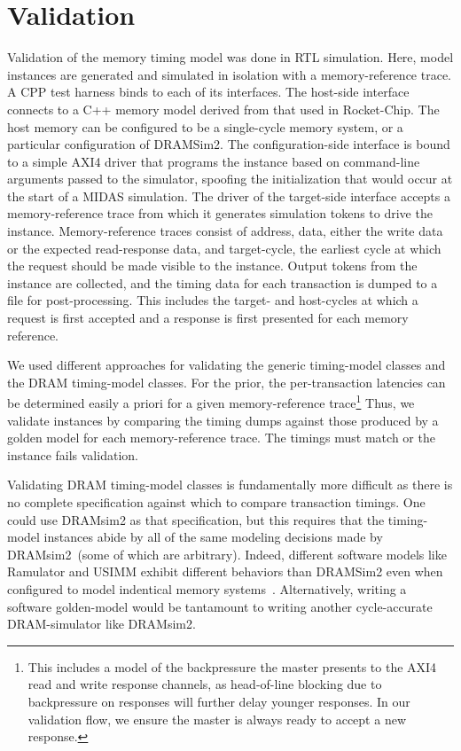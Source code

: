 \section{Validation}

Validation of the memory timing model was done in RTL simulation. Here, model
instances are generated and simulated in isolation with a memory-reference trace.
A CPP test harness binds to each of its interfaces.  The host-side interface
connects to a C++ memory model derived from that used in Rocket-Chip. The host
memory can be configured to be a single-cycle memory system, or a particular
configuration of DRAMSim2.  The configuration-side interface is bound to a
simple AXI4 driver that programs the instance based on command-line arguments
passed to the simulator, spoofing the initialization that would occur at the
start of a MIDAS simulation. The driver of the target-side interface accepts a
memory-reference trace from which it generates simulation tokens to drive the instance.
Memory-reference traces consist of address, data, either the write data or the
expected read-response data, and target-cycle, the earliest cycle at which the
request should be made visible to the instance. Output tokens from the instance are
collected, and the timing data for each transaction is dumped to a file for
post-processing. This includes the target- and host-cycles at which a request is
first accepted and a response is first presented for each memory reference.

We used different approaches for validating the generic timing-model classes
and the DRAM timing-model classes. For the prior, the per-transaction latencies
can be determined easily a priori for a given memory-reference trace\footnote{This
includes a model of the backpressure the master presents to the AXI4 read and
write response channels, as head-of-line blocking due to backpressure on
responses will further delay younger responses.  In our validation flow, we
ensure the master is always ready to accept a new response.} Thus, we validate
instances by comparing the timing dumps against those produced by a golden model
for each memory-reference trace. The timings must match or the instance fails
validation.

Validating DRAM timing-model classes is fundamentally more difficult as there
is no complete specification against which to compare transaction timings.
One could use DRAMsim2 as that specification, but this requires that the
timing-model instances abide by all of the same modeling decisions made by
DRAMsim2~(some of which are arbitrary). Indeed, different software models like
Ramulator and USIMM exhibit different behaviors than DRAMSim2 even when
configured to model indentical memory systems~\cite{ramulator}. Alternatively,
writing a software golden-model would be tantamount to writing another
cycle-accurate DRAM-simulator like DRAMsim2.

